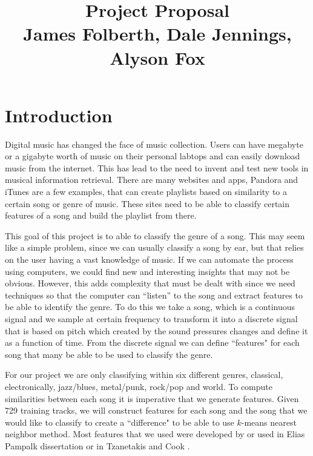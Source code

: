\documentclass[12pt]{article}
\begin{document}
                                       
\title{Project Proposal\\
James Folberth, Dale Jennings, Alyson Fox}
\maketitle
\section{Introduction}
\indent Digital music has changed the face of music collection. Users can have megabyte or a gigabyte worth of music on their personal labtops and can easily download music from the internet. This has lead to the need to invent and test new tools in musical information retrieval. There are many websites and apps, Pandora and iTunes are a few examples, that can create playlists based on similarity to a certain song or genre of music. These sites need to be able to classify certain features of a song and build the playlist from there. 

\indent This goal of this project is to able to classify the genre of a song. This may seem like a simple problem, since we can usually classify a song by ear, but that relies on the user having a vast knowledge of music. If we can automate the process using computers, we could find new and interesting insights that may not be obvious. However, this adds complexity that must be dealt with since we need techniques so that  the computer can ``listen'' to the song and extract features to be able to identify the genre. To do this we take  a song, which is a continuous signal and we sample at certain frequency to transform it into a discrete signal that is based on pitch which created by the sound pressures changes  and define it as a function of time. From the discrete signal we can define  ``features" for each song that many be able to be used to classify the genre. 

\indent For our project we are only classifying within six different genres, classical, electronically, jazz/blues, metal/punk, rock/pop and world. To compute similarities between each song it is imperative that we generate features. Given 729 training tracks, we will construct features for each song and the song that we would like to classify to create a ``difference" to be able to use $k$-means nearest neighbor method. Most features that we used were developed by or used in Elias Pampalk dissertation \cite{pampalk:dissertation} or in Tzanetakis and Cook \cite{tzanetakis:classification}.%
\indent
\end{document}
